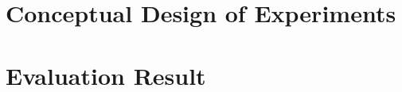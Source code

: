 \chapter{Conceptual Design of Experiments}
\label{chapter:conept}
\thispagestyle{myheadings}

\graphicspath{{3_Body/Figures/}}

\clearpage



\chapter{Evaluation Result}
\label{chapter:evaluation}
\thispagestyle{myheadings}

\clearpage
